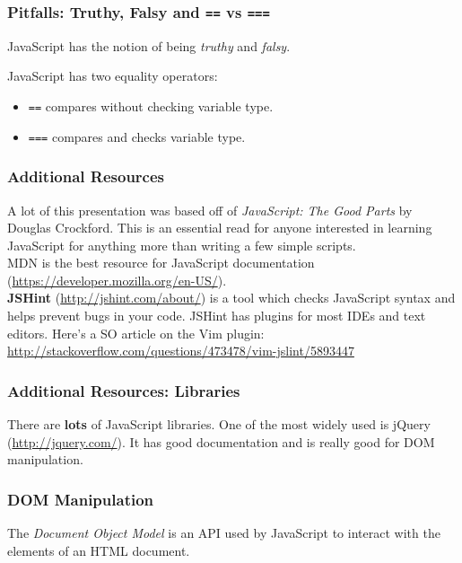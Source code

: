\documentclass{lug}
\begin{document}
\begin{frame}
    \frametitle{Pitfalls: Truthy, Falsy and \texttt{==} vs \texttt{===}}

    JavaScript has the notion of being \textit{truthy} and \textit{falsy}.

    JavaScript has two equality operators:
    \begin{itemize}
        \item \texttt{==} compares without checking variable type.
        \item \texttt{===} compares and checks variable type.
    \end{itemize}
\end{frame}

\begin{frame}
    \frametitle{Additional Resources}

    A lot of this presentation was based off of \textit{JavaScript: The Good Parts} by Douglas
    Crockford. This is an essential read for anyone interested in learning JavaScript for anything
    more than writing a few simple scripts.\\

    MDN is the best resource for JavaScript documentation
    (\url{https://developer.mozilla.org/en-US/}). \\

    \textbf{JSHint} (\url{http://jshint.com/about/}) is a tool which checks JavaScript syntax and
    helps prevent bugs in your code. JSHint has plugins for most IDEs and text editors. Here's a SO
    article on the Vim plugin: \url{http://stackoverflow.com/questions/473478/vim-jslint/5893447}\\

\end{frame}

\begin{frame}
    \frametitle{Additional Resources: Libraries}

    There are \textbf{lots} of JavaScript libraries. One of the most widely used is jQuery
    (\url{http://jquery.com/}). It has good documentation and is really good for DOM
    manipulation.\\

\end{frame}

\begin{frame}
    \frametitle{DOM Manipulation}
    The \textit{Document Object Model} is an API used by JavaScript to interact with the elements of
    an HTML document.\footnotemark[1]


\end{frame}
\end{document}

